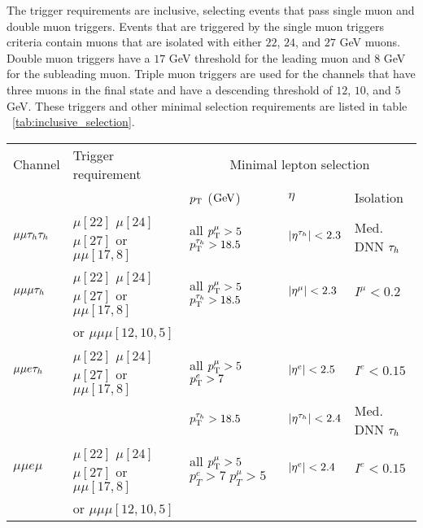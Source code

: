 The trigger requirements are inclusive, selecting events that pass single muon and double muon triggers. Events that are triggered by the single muon triggers criteria contain muons that are isolated with either $22$, $24$, and $27$ GeV muons. Double muon triggers have a $17$ GeV threshold for the leading muon and $8$ GeV for the subleading muon. Triple muon triggers are used for the channels that have three muons in the final state and have a descending threshold of $12$, $10$, and $5$ GeV. These triggers and other minimal selection requirements are listed in table ~\ref{tab:inclusive_selection}.


\begin{table}[h!tbp]
\centering
{}
\begin{tabular}{lllll}
  Channel     &  Trigger requirement                      & \multicolumn{3}{c}{Minimal lepton selection}                        \\ \cline{3-5}
              &                                            & $p_{\mathrm{T}}$ ($\text{Ge\hspace{-.08em}V}{}$)  & $\eta$                    &    Isolation      \\
\hline
$\mu\mu\tau_h\tau_h$  &  $\mu[22]$ $\mu[24]$  $\mu[27]$   or  $\mu\mu[17,8]$       &all $p_{\mathrm{T}}^\mu>5$ $p_{\mathrm{T}}^{\tau_h}>18.5$    & $\lvert \eta^{\tau_h} \rvert<2.3$  &   Med. DNN $\tau_h$   \\

$\mu\mu\mu\tau_h$    &  $\mu[22]$ $\mu[24]$  $\mu[27]$   or  $\mu\mu[17,8]$                     & all $p_{\mathrm{T}}^\mu>5$ $p_{\mathrm{T}}^{\tau_h}>18.5$      &  $\lvert \eta^\mu \rvert<2.3$    &   $I^{\mu}<0.2$ \\

& or  $\mu\mu\mu[12,10,5]$  &  & & \\ 

$\mu\mu e \tau_h$    &$\mu[22]$ $\mu[24]$  $\mu[27]$   or  $\mu\mu[17,8]$                         & all $p_{\mathrm{T}}^\mu>5$ $p_{\mathrm{T}}^e>7$      &  $\lvert \eta^e \rvert<2.5$     &   $I^{e}<0.15$  \\
              &                          & $p_{\mathrm{T}}^{\tau_h}>18.5$    &  $\lvert \eta^{\tau_h} \rvert<2.4$ &   Med. DNN $\tau_h$   \\

$\mu\mu e \mu $     & $\mu[22]$ $\mu[24]$  $\mu[27]$   or  $\mu\mu[17,8]$       &all $p_{\mathrm{T}}^\mu>5$ $p_T^e >7\; p_T^\mu >5$      & $\lvert \eta^e \rvert<2.4$      & $I^{e}<0.15$    \\
& or  $\mu\mu\mu[12,10,5]$  &  & & \\ 

\hline
\end{tabular}
\end{table}

